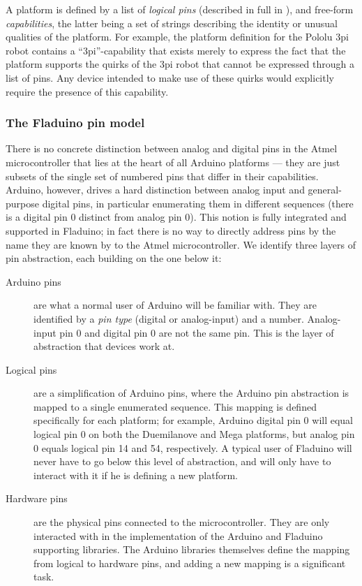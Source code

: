 \documentclass[a4paper, oneside, final]{memoir}
\let\Fref\undefined
\begin{document}
A platform is defined by a list of \textit{logical pins} (described in
full in \Fref{sec:pins}), and free-form \textit{capabilities}, the
latter being a set of strings describing the identity or unusual
qualities of the platform.  For example, the platform definition for
the Pololu 3pi robot contains a ``3pi''-capability that exists merely
to express the fact that the platform supports the quirks of the 3pi
robot that cannot be expressed through a list of pins.  Any device
intended to make use of these quirks would explicitly require the
presence of this capability.

\subsubsection{The Fladuino pin model}
\label{sec:pins}
There is no concrete distinction between analog and digital pins in
the Atmel microcontroller that lies at the heart of all Arduino
platforms --- they are just subsets of the single set of numbered pins
that differ in their capabilities.  Arduino, however, drives a hard
distinction between analog input and general-purpose digital pins, in
particular enumerating them in different sequences (there is a digital
pin 0 distinct from analog pin 0).  This notion is fully integrated
and supported in Fladuino; in fact there is no way to directly address
pins by the name they are known by to the Atmel microcontroller.  We
identify three layers of pin abstraction, each building on the one
below it:

\begin{description}
\item[Arduino pins] are what a normal user of Arduino will be familiar
  with.  They are identified by a \textit{pin type} (digital or
  analog-input) and a number.  Analog-input pin 0 and digital pin 0
  are not the same pin.  This is the layer of abstraction that devices
  work at.
\item[Logical pins] are a simplification of Arduino pins, where the
  Arduino pin abstraction is mapped to a single enumerated sequence.
  This mapping is defined specifically for each platform; for example,
  Arduino digital pin 0 will equal logical pin 0 on both the
  Duemilanove and Mega platforms, but analog pin 0 equals logical pin
  14 and 54, respectively.  A typical user of Fladuino will never have
  to go below this level of abstraction, and will only have to
  interact with it if he is defining a new platform.
\item[Hardware pins] are the physical pins connected to the
  microcontroller.  They are only interacted with in the
  implementation of the Arduino and Fladuino supporting libraries.
  The Arduino libraries themselves define the mapping from logical to
  hardware pins, and adding a new mapping is a significant task.
\end{description}
\end{document}
